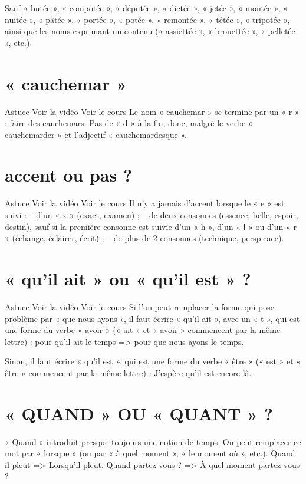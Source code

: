 Sauf « butée », « compotée », « députée », « dictée », « jetée », « montée », « nuitée », « pâtée », « portée », « potée », « remontée », « tétée », « tripotée », ainsi que les noms exprimant un contenu (« assiettée », « brouettée », « pelletée », etc.).

\section{« cauchemar »}

Astuce Voir la vidéo Voir le cours
Le nom « cauchemar » se termine par un « r » : faire des cauchemars.
Pas de « d » à la fin, donc, malgré le verbe « cauchemarder » et l'adjectif « cauchemardesque ».

\section{accent ou pas ?}

Astuce Voir la vidéo Voir le cours
Il n'y a jamais d'accent lorsque le « e » est suivi :
– d'un « x » (exact, examen) ;
– de deux consonnes (essence, belle, espoir, destin), sauf si la première consonne est suivie d'un « h », d'un « l » ou d'un « r » (échange, éclairer, écrit) ;
– de plus de 2 consonnes (technique, perspicace).

\section{« qu'il ait » ou « qu'il est » ?}

Astuce Voir la vidéo Voir le cours
Si l'on peut remplacer la forme qui pose problème par « que nous ayons », il faut écrire « qu'il ait », avec un « t », qui est une forme du verbe « avoir » (« ait » et « avoir » commencent par la même lettre) : pour qu'il ait le temps => pour que nous ayons le temps.

Sinon, il faut écrire « qu'il est », qui est une forme du verbe « être » (« est » et « être » commencent par la même lettre) : J'espère qu'il est encore là.

\section{« QUAND » OU « QUANT » ?}

« Quand » introduit presque toujours une notion de temps. On peut remplacer ce mot par « lorsque » (ou par « à quel moment », « le moment où », etc.).
Quand il pleut => Lorsqu'il pleut.
Quand partez‑vous ? => À quel moment partez‑vous ?

